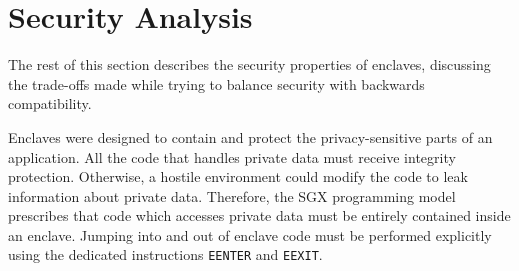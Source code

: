 \section{Security Analysis}
\label{sec:security}

The rest of this section describes the security properties of
enclaves, discussing the trade-offs made while trying to balance security with
backwards compatibility.

%
%







Enclaves were designed to contain and protect the privacy-sensitive parts of an
application. All the code that handles private data must receive integrity
protection. Otherwise, a hostile environment could modify the code to leak
information about private data. Therefore, the SGX programming model prescribes
that code which accesses private data must be entirely contained inside an
enclave. Jumping into and out of enclave code must be performed explicitly
using the dedicated instructions \texttt{EENTER} and \texttt{EEXIT}.

